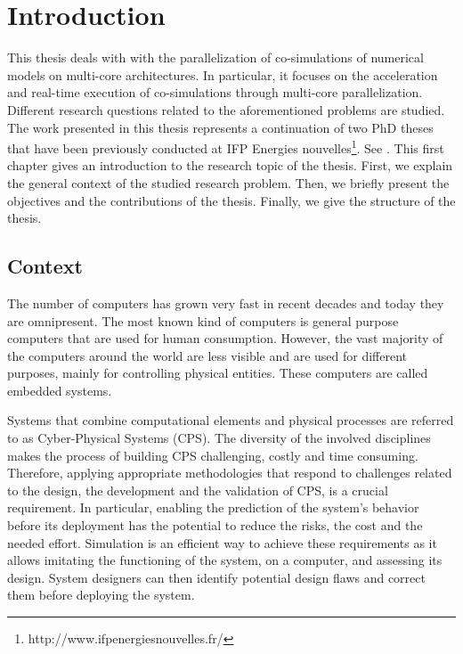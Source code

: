 
\chapter{\label{ch:1-intro}Introduction} 

\minitoc

This thesis deals with with the parallelization of co-simulations of numerical models on multi-core architectures. In particular, it focuses on the acceleration and real-time execution of co-simulations through multi-core parallelization. Different research questions related to the aforementioned problems are studied. The work presented in this thesis represents a continuation of two PhD theses that have been previously conducted at IFP Energies nouvelles\footnote{http://www.ifpenergiesnouvelles.fr/}. See \cite{faure:2011,benkhaled:2014_thesis}. This first chapter gives an introduction to the research topic of the thesis. First, we explain the general context of the studied research problem. Then, we briefly present the objectives and the contributions of the thesis. Finally, we give the structure of the thesis. 

\section{Context}

The number of computers has grown very fast in recent decades and today they are omnipresent. The most known kind of computers is general purpose computers that are used for human consumption. However, the vast majority of the computers around the world are less visible and are used for different purposes, mainly for controlling physical entities. These computers are called embedded systems. 

Systems that combine computational elements and physical processes are referred to as Cyber-Physical Systems (CPS). The diversity of the involved disciplines makes the process of building CPS challenging, costly and time consuming. Therefore, applying appropriate methodologies that respond to challenges related to the design, the development and the validation of CPS, is a crucial requirement. In particular, enabling the prediction of the system's behavior before its deployment has the potential to reduce the risks, the cost and the needed effort. Simulation is an efficient way to achieve these requirements as it allows imitating the functioning of the system, on a computer, and assessing its design. System designers can then identify potential design flaws and correct them before deploying the system.

